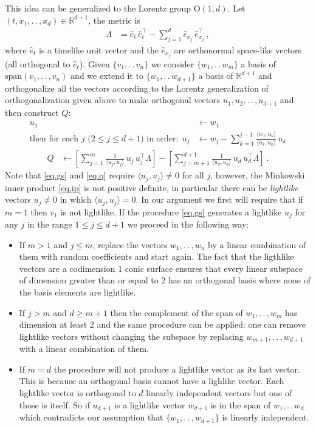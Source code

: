 \documentclass{article}
\theoremstyle{Hogg}
\newcommand{\inner}[2]{\langle{#1},{#2}\rangle}
\renewcommand{\ldots}{.\,.\,}
\renewcommand{\cdots}{\ldots}
\begin{document}
This idea can be generalized to the Lorentz group O$(1,d)$. Let $(t,x_1,\ldots, x_d) \in \mathbb R^{d+1}$, the metric is
\begin{align}
    \Lambda &= \hat{e}_t\,\hat{e}_t^\top - \sum_{j=1}^d \hat{e}_{x_j}\,\hat{e}_{x_j}^\top
    ~,
\end{align}
where $\hat{e}_t$ is a timelike unit vector and the $\hat{e}_{x_j}$ are orthonormal space-like vectors (all orthogonal to $\hat{e}_t$).
Given $\{v_1,\ldots v_n\}$ we consider $\{w_1,\ldots w_m\}$ a basis of  $\text{span}(v_1,\ldots,v_n)$ and we extend it to $\{w_1,\ldots w_{d+1}\}$ a basis of $\mathbb R^{d+1}$ and orthogonalize all the vectors according to the Lorentz generalization of orthogonalization given above to make orthogonal vectors $u_1,u_2,\cdots,u_{d+1}$ and then construct $Q$:
\begin{align}
    u_1 &\leftarrow w_1
    \\
    \mbox{then for each $j$ ($2\leq j\leq d+1$) in order:} ~~ u_j &\leftarrow w_j - \sum_{k=1}^{j-1}\frac{\inner{w_j}{u_k}}{\inner{u_k}{u_k}}\,u_k  \label{eq.gs}
\end{align}\vspace{-1\baselineskip}\begin{align}
    Q &\leftarrow \left[\sum_{j=1}^{m} \frac{1}{\inner{u_j}{u_j}}\,u_j\,u_j^\top \Lambda\right] - \left[\sum_{j=m+1}^{d+1} \frac{1}{\inner{u_d}{u_d}}\,u_d\,u_d^\top \Lambda \right]
    ~. \label{eq.q}
\end{align}
Note that \eqref{eq.gs} and \eqref{eq.q} require $\inner{u_j}{u_j}\neq 0$ for all $j$, however, the Minkowski inner product \eqref{eq.ip} is not positive definite, in particular there can be \emph{lightlike} vectors $u_j\neq 0$ in which $\inner{u_j}{u_j}= 0$. 
In our argument we first will require that if $m=1$ then $v_1$ is not lightlike.
If the procedure \eqref{eq.gs} generates a lightlike $u_j$ for any $j$ in the range $1\leq j\leq d+1$ we proceed in the following way:
\begin{itemize}
    \item If $m>1$ and $j\leq m$, replace the vectors $w_1, \ldots, w_n$ by a linear combination of them with random coefficients and start again. The fact that the ligthlike vectors are a codimension 1 conic surface ensures that every linear subspace of dimension greater than or equal to 2 has an orthogonal basis where none of the basis elements are lightlike.
    \item If $j>m$ and $d\geq m+1$ then the complement of the span of $w_1,\ldots,w_m$ has dimension at least 2 and the same procedure can be applied: one can remove lightlike vectors without changing the subspace by replacing $w_{m+1},\ldots,w_{d+1}$ with a linear combination of them.
    \item If $m=d$ the procedure will not produce a lightlike vector as its last vector. This is because an orthogonal basis cannot have a lighlike vector. Each lightlike vector is orthogonal to $d$ linearly independent vectors but one of those is itself. So if $u_{d+1}$ is a lightlike vector $w_{d+1}$ is in the span of $w_1,\ldots w_d$ which contradicts our assumption that $\{w_1,\ldots, w_{d+1}\}$ is linearly independent.
\end{itemize}
\end{document}
